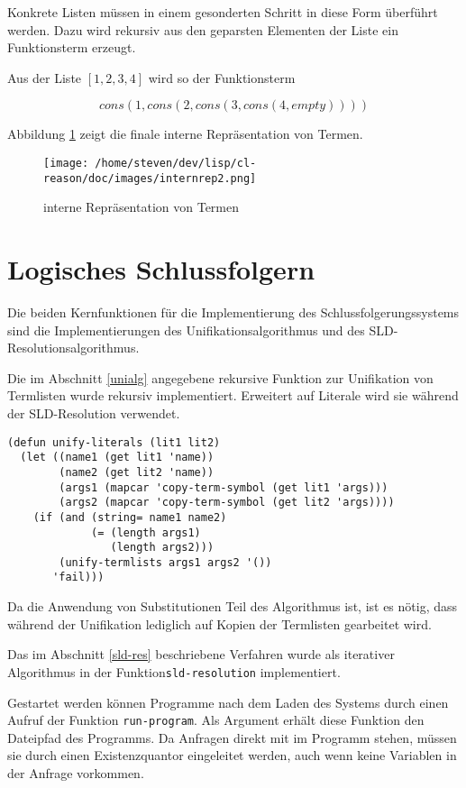 Konkrete Listen müssen in einem gesonderten Schritt in diese Form überführt werden. Dazu wird rekursiv aus den geparsten Elementen der Liste ein Funktionsterm erzeugt.

Aus der Liste $[1,2,3,4]$ wird so der Funktionsterm

\begin{equation}
  cons(1,cons(2,cons(3,cons(4,empty))))
\end{equation}

Abbildung \ref{internrep2} zeigt die finale interne Repräsentation von Termen.

\begin{figure} %
	\centering
		\texttt{[image: /home/steven/dev/lisp/cl-reason/doc/images/internrep2.png]}
	\caption{interne Repräsentation von Termen}
	\label{internrep2}
\end{figure}
  
\section{Logisches Schlussfolgern}
Die beiden Kernfunktionen für die Implementierung des Schlussfolgerungssystems sind die Implementierungen des Unifikationsalgorithmus und des SLD-Resolutionsalgorithmus.

Die im Abschnitt \ref{unialg} angegebene rekursive Funktion zur Unifikation von Termlisten wurde rekursiv implementiert. Erweitert auf Literale wird sie während der SLD-Resolution verwendet.

\begin{verbatim}
(defun unify-literals (lit1 lit2) 
  (let ((name1 (get lit1 'name))
        (name2 (get lit2 'name))
        (args1 (mapcar 'copy-term-symbol (get lit1 'args)))
        (args2 (mapcar 'copy-term-symbol (get lit2 'args))))
    (if (and (string= name1 name2)
             (= (length args1)
                (length args2))) 
        (unify-termlists args1 args2 '())
       'fail)))
\end{verbatim}

Da die Anwendung von Substitutionen Teil des Algorithmus ist, ist es nötig, dass während der Unifikation lediglich auf Kopien der Termlisten gearbeitet wird. 

Das im Abschnitt \ref{sld-res} beschriebene Verfahren wurde als iterativer Algorithmus in der Funktion{\tt sld-resolution} implementiert.

Gestartet werden können Programme nach dem Laden des Systems durch einen Aufruf der Funktion {\tt run-program}. Als Argument erhält diese Funktion den Dateipfad des Programms. Da Anfragen direkt mit im Programm stehen, müssen sie durch einen Existenzquantor eingeleitet werden, auch wenn keine Variablen in der Anfrage vorkommen.
